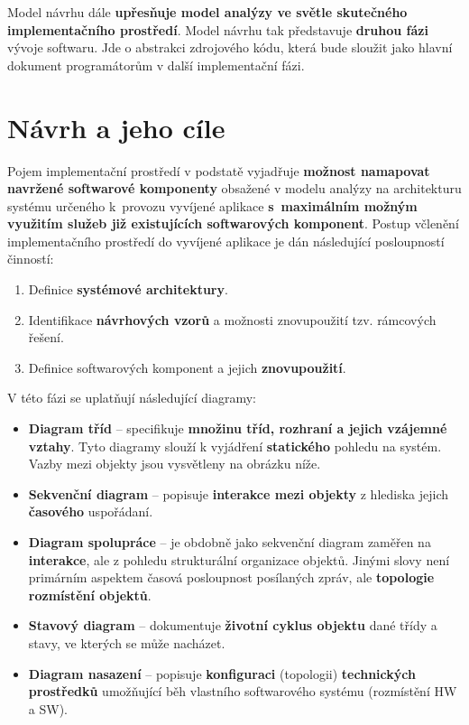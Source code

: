 Model návrhu dále \textbf{upřesňuje model analýzy ve světle skutečného implementačního prostředí}. Model návrhu tak představuje \textbf{druhou fázi} vývoje softwaru. Jde o abstrakci zdrojového kódu, která bude sloužit jako hlavní dokument programátorům v další implementační fázi.

\section{Návrh a jeho cíle}
Pojem implementační prostředí v podstatě vyjadřuje \textbf{možnost namapovat navržené softwarové komponenty} obsažené v modelu analýzy na architekturu systému určeného k provozu vyvíjené aplikace \textbf{s maximálním možným využitím služeb již existujících softwarových komponent}. Postup včlenění implementačního prostředí do vyvíjené aplikace je dán následující posloupností činností:
\begin{enumerate}
    \item Definice \textbf{systémové architektury}.
    \item Identifikace \textbf{návrhových vzorů} a možnosti znovupoužití tzv. rámcových řešení.
    \item Definice softwarových komponent a jejich \textbf{znovupoužití}.
\end{enumerate}
V této fázi se uplatňují následující diagramy:

\begin{itemize}
    \item \textbf{Diagram tříd} -- specifikuje \textbf{množinu tříd, rozhraní a jejich vzájemné vztahy}. Tyto diagramy slouží k vyjádření \textbf{statického} pohledu na systém. Vazby mezi objekty jsou vysvětleny na obrázku níže.
    \item \textbf{Sekvenční diagram} -- popisuje \textbf{interakce mezi objekty} z hlediska jejich \textbf{časového} uspořádaní.
    \item \textbf{Diagram spolupráce} -- je obdobně jako sekvenční diagram zaměřen na \textbf{interakce}, ale {z pohledu strukturální organizace objektů}. Jinými slovy není primárním aspektem časová posloupnost posílaných zpráv, ale \textbf{topologie rozmístění objektů}.
    \item \textbf{Stavový diagram} -- dokumentuje \textbf{životní cyklus objektu} dané třídy a stavy, ve kterých se může nacházet.
    \item \textbf{Diagram nasazení} -- popisuje \textbf{konfiguraci} (topologii) \textbf{technických prostředků} umožňující běh vlastního softwarového systému (rozmístění HW a SW).
\end{itemize}

